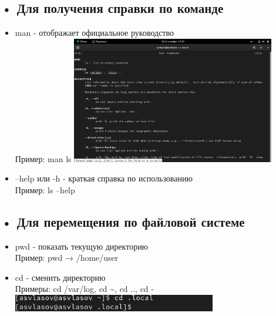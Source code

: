 \documentclass[
  12pt,
  a4paper,
  DIV=11,
  numbers=noendperiod]{scrreprt}
\providecommand{\tightlist}{%
  \setlength{\itemsep}{0pt}\setlength{\parskip}{0pt}}\usepackage{longtable,booktabs,array}
\begin{document}
\subsection{• Для получения справки по
команде}\label{ux434ux43bux44f-ux43fux43eux43bux443ux447ux435ux43dux438ux44f-ux441ux43fux440ux430ux432ux43aux438-ux43fux43e-ux43aux43eux43cux430ux43dux434ux435}

\begin{itemize}
\tightlist
\item
  man - отображает официальное руководство\\
  Пример: man ls
  \includegraphics[width=0.7\textwidth,height=\textheight]{image/18.png}
\item
  --help или -h - краткая справка по использованию\\
  Пример: ls --help
\end{itemize}

\subsection{• Для перемещения по файловой
системе}\label{ux434ux43bux44f-ux43fux435ux440ux435ux43cux435ux449ux435ux43dux438ux44f-ux43fux43e-ux444ux430ux439ux43bux43eux432ux43eux439-ux441ux438ux441ux442ux435ux43cux435}

\begin{itemize}
\tightlist
\item
  pwd - показать текущую директорию\\
  Пример: pwd → /home/user
\item
  cd - сменить директорию\\
  Примеры: cd /var/log, cd \textasciitilde, cd .., cd -
  \includegraphics[width=0.7\textwidth,height=\textheight]{image/19.png}
\end{itemize}
\end{document}
